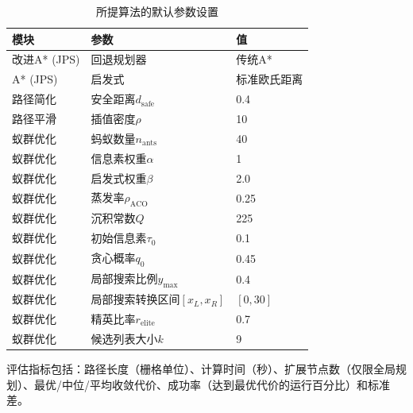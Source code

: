 \documentclass[lettersize,journal]{IEEEtran}
\begin{document}
\begin{table}[!t]

\caption{所提算法的默认参数设置}
\label{tab:params}
\centering
\begin{tabular}{lll}
\toprule
模块 & 参数 & 值 \\
\midrule
改进A* (JPS) & 回退规划器 & 传统A* \\
A* (JPS) & 启发式 & 标准欧氏距离 \\
路径简化 & 安全距离$d_{\mathrm{safe}}$ & 0.4 \\
路径平滑 & 插值密度$\rho$ & 10 \\
蚁群优化 & 蚂蚁数量$n_{\mathrm{ants}}$ & 40 \\
蚁群优化 & 信息素权重$\alpha$ & 1 \\
蚁群优化 & 启发式权重$\beta$ & 2.0 \\
蚁群优化 & 蒸发率$\rho_{\mathrm{ACO}}$ & 0.25 \\
蚁群优化 & 沉积常数$Q$ & 225 \\
蚁群优化 & 初始信息素$\tau_0$ & 0.1 \\
蚁群优化 & 贪心概率$q_0$ & 0.45 \\
蚁群优化 & 局部搜索比例$y_{\max}$ & 0.4 \\
蚁群优化 & 局部搜索转换区间$[x_L, x_R]$ & $[0, 30]$ \\
蚁群优化 & 精英比率$r_{\mathrm{elite}}$ & 0.7 \\
蚁群优化 & 候选列表大小$k$ & 9 \\
\bottomrule
\end{tabular}
\end{table}
评估指标包括：路径长度（栅格单位）、计算时间（秒）、扩展节点数（仅限全局规划）、最优/中位/平均收敛代价、成功率（达到最优代价的运行百分比）和标准差。
\end{document}
